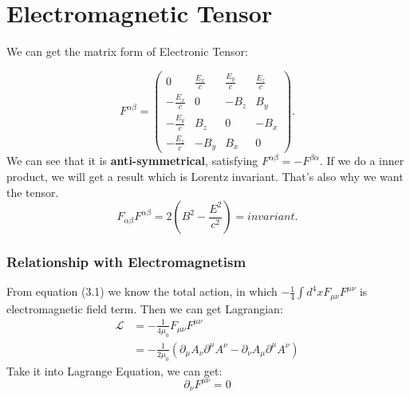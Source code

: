 \documentclass[openany,10pt]{book}
\theoremstyle{definition}
\theoremstyle{definition}
\theoremstyle{remark}
\begin{document}
\section{Electromagnetic Tensor}

We can get the matrix form of Electronic Tensor:

\begin{equation}
    F^{\alpha\beta}={\left(\begin{array}{cccc}
0&\frac{E_x}{c}&\frac{E_y}{c}&\frac{E_z}{c}\\
-\frac{E_x}{c}&0&-B_z&B_y\\
-\frac{E_y}{c}&B_z&0&-B_x\\
-\frac{E_z}{c}&-B_y&B_x&0
\end{array}
\right)}.
\end{equation}
We can see that it is \textbf{anti-symmetrical}, satisfying $F^{\alpha\beta}=-F^{\beta\alpha}$.
If we do a inner product, we will get a result which is Lorentz invariant. That's also why we want the tensor.
\begin{equation}
    F_{\alpha\beta}F^{\alpha\beta}=2(B^2-\frac{E^2}{c^2})=invariant.
\end{equation}

\subsubsection{Relationship with Electromagnetism}
From equation (3.1) we know the total action, in which $-\frac{1}{4}\int d^4xF_{\mu\nu}F^{\mu\nu}$ is electromagnetic field term.
Then we can get Lagrangian:
\begin{equation}
\begin{aligned}
    \mathcal{L}&=-\frac{1}{4\mu_0}F_{\mu\nu}F^{\mu\nu}\\
    &=-\frac{1}{2\mu_0}(\partial_\mu A_\nu\partial^\mu A^\nu-\partial_\nu A_\mu\partial^\mu A^\nu)
\end{aligned}
\end{equation}
Take it into Lagrange Equation, we can get: 
\begin{equation}
    \partial_\nu F^{\mu\nu}=0
\end{equation}
\end{document}
